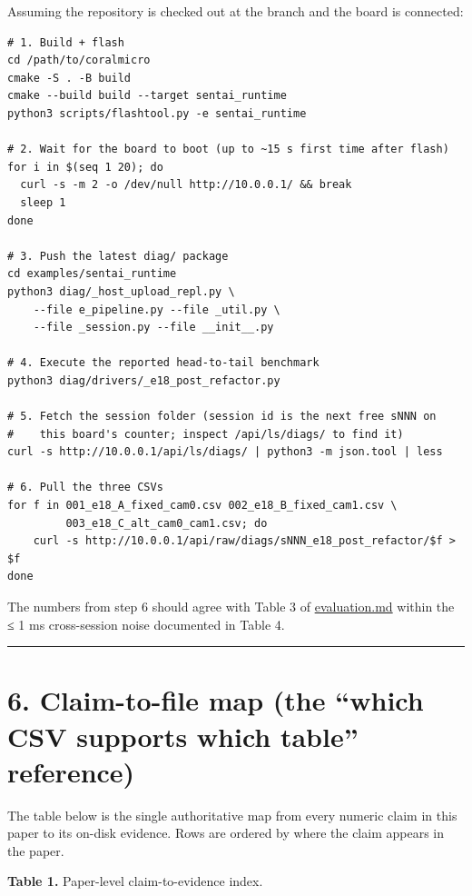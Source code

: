 Assuming the repository is checked out at the branch and the board is
connected:

\begin{verbatim}
# 1. Build + flash
cd /path/to/coralmicro
cmake -S . -B build
cmake --build build --target sentai_runtime
python3 scripts/flashtool.py -e sentai_runtime

# 2. Wait for the board to boot (up to ~15 s first time after flash)
for i in $(seq 1 20); do
  curl -s -m 2 -o /dev/null http://10.0.0.1/ && break
  sleep 1
done

# 3. Push the latest diag/ package
cd examples/sentai_runtime
python3 diag/_host_upload_repl.py \
    --file e_pipeline.py --file _util.py \
    --file _session.py --file __init__.py

# 4. Execute the reported head-to-tail benchmark
python3 diag/drivers/_e18_post_refactor.py

# 5. Fetch the session folder (session id is the next free sNNN on
#    this board's counter; inspect /api/ls/diags/ to find it)
curl -s http://10.0.0.1/api/ls/diags/ | python3 -m json.tool | less

# 6. Pull the three CSVs
for f in 001_e18_A_fixed_cam0.csv 002_e18_B_fixed_cam1.csv \
         003_e18_C_alt_cam0_cam1.csv; do
    curl -s http://10.0.0.1/api/raw/diags/sNNN_e18_post_refactor/$f > $f
done
\end{verbatim}

The numbers from step 6 should agree with Table 3 of \url{evaluation.md}
within the ≤ 1 ms cross-session noise documented in Table 4.

\begin{center}\rule{0.5\linewidth}{0.5pt}\end{center}

\section{6. Claim-to-file map (the ``which CSV supports which table''
reference)}\label{claim-to-file-map-the-which-csv-supports-which-table-reference}

The table below is the single authoritative map from every numeric claim
in this paper to its on-disk evidence. Rows are ordered by where the
claim appears in the paper.

\textbf{Table 1.} Paper-level claim-to-evidence index.

